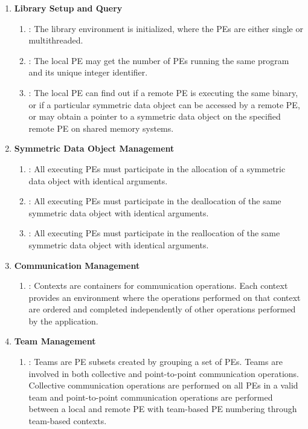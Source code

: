 \begin{enumerate}

\item \textbf{Library Setup and Query}
\begin{enumerate}
  \item {}: The \openshmem library environment is initialized,
   where the \acp{PE} are either single or multithreaded.
  \item {}: The local \ac{PE} may get the number of \acp{PE} running
      the same program and its unique integer identifier.
  \item {}: The local \ac{PE} can find out if a remote \ac{PE} is
      executing the same binary, or if a particular symmetric data object can be
      accessed by a remote \ac{PE}, or may obtain a pointer to a symmetric data
      object on the specified remote \ac{PE} on shared memory systems.
\end{enumerate}

\item \textbf{Symmetric Data Object Management}
\begin{enumerate}
  \item {}: All executing \acp{PE} must participate in the
      allocation of a symmetric data object with identical arguments.
  \item  {}: All executing \acp{PE} must participate in the
      deallocation of the same symmetric data object with identical arguments.
  \item  {}: All executing \acp{PE} must participate in the
      reallocation of the same symmetric data object with identical arguments.
\end{enumerate}

\item \textbf{Communication Management}
\begin{enumerate}
    \item {}: Contexts are containers for communication operations.
        Each context provides an environment where the operations performed on
        that context are ordered and completed independently of other operations
        performed by the application.
\end{enumerate}

\item \textbf{Team Management}
\begin{enumerate}
    \item {}: Teams are \ac{PE} subsets created by grouping a set of
    \acp{PE}. Teams are involved in both collective and point-to-point
    communication operations. Collective communication operations are performed
    on all \acp{PE} in a valid team and point-to-point communication operations
    are performed between a local and remote \ac{PE} with team-based \ac{PE}
    numbering through team-based contexts.
\end{enumerate}


\end{enumerate}
